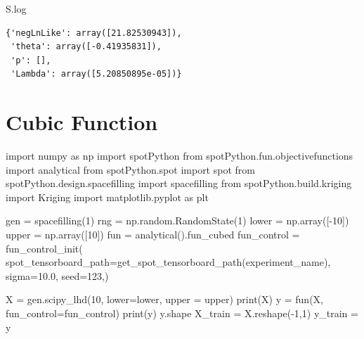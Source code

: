 \documentclass[
  letterpaper,
  DIV=11,
  numbers=noendperiod]{scrreprt}
\newenvironment{Shaded}{\begin{snugshade}}{\end{snugshade}}
\newcommand{\BuiltInTok}[1]{\textcolor[rgb]{0.00,0.23,0.31}{#1}}
\newcommand{\DecValTok}[1]{\textcolor[rgb]{0.68,0.00,0.00}{#1}}
\newcommand{\FloatTok}[1]{\textcolor[rgb]{0.68,0.00,0.00}{#1}}
\newcommand{\ImportTok}[1]{\textcolor[rgb]{0.00,0.46,0.62}{#1}}
\newcommand{\NormalTok}[1]{\textcolor[rgb]{0.00,0.23,0.31}{#1}}
\newcommand{\OperatorTok}[1]{\textcolor[rgb]{0.37,0.37,0.37}{#1}}
\begin{document}
\begin{Shaded}
\begin{Highlighting}[]
\NormalTok{S.log}
\end{Highlighting}
\end{Shaded}

\begin{verbatim}
{'negLnLike': array([21.82530943]),
 'theta': array([-0.41935831]),
 'p': [],
 'Lambda': array([5.20850895e-05])}
\end{verbatim}

\hypertarget{cubic-function}{%
\section{Cubic Function}\label{cubic-function}}

\begin{Shaded}
\begin{Highlighting}[]
\ImportTok{import}\NormalTok{ numpy }\ImportTok{as}\NormalTok{ np}
\ImportTok{import}\NormalTok{ spotPython}
\ImportTok{from}\NormalTok{ spotPython.fun.objectivefunctions }\ImportTok{import}\NormalTok{ analytical}
\ImportTok{from}\NormalTok{ spotPython.spot }\ImportTok{import}\NormalTok{ spot}
\ImportTok{from}\NormalTok{ spotPython.design.spacefilling }\ImportTok{import}\NormalTok{ spacefilling}
\ImportTok{from}\NormalTok{ spotPython.build.kriging }\ImportTok{import}\NormalTok{ Kriging}
\ImportTok{import}\NormalTok{ matplotlib.pyplot }\ImportTok{as}\NormalTok{ plt}

\NormalTok{gen }\OperatorTok{=}\NormalTok{ spacefilling(}\DecValTok{1}\NormalTok{)}
\NormalTok{rng }\OperatorTok{=}\NormalTok{ np.random.RandomState(}\DecValTok{1}\NormalTok{)}
\NormalTok{lower }\OperatorTok{=}\NormalTok{ np.array([}\OperatorTok{{-}}\DecValTok{10}\NormalTok{])}
\NormalTok{upper }\OperatorTok{=}\NormalTok{ np.array([}\DecValTok{10}\NormalTok{])}
\NormalTok{fun }\OperatorTok{=}\NormalTok{ analytical().fun\_cubed}
\NormalTok{fun\_control }\OperatorTok{=}\NormalTok{ fun\_control\_init(}
\NormalTok{    spot\_tensorboard\_path}\OperatorTok{=}\NormalTok{get\_spot\_tensorboard\_path(experiment\_name),}
\NormalTok{    sigma}\OperatorTok{=}\FloatTok{10.0}\NormalTok{,}
\NormalTok{    seed}\OperatorTok{=}\DecValTok{123}\NormalTok{,)}

\NormalTok{X }\OperatorTok{=}\NormalTok{ gen.scipy\_lhd(}\DecValTok{10}\NormalTok{, lower}\OperatorTok{=}\NormalTok{lower, upper }\OperatorTok{=}\NormalTok{ upper)}
\BuiltInTok{print}\NormalTok{(X)}
\NormalTok{y }\OperatorTok{=}\NormalTok{ fun(X, fun\_control}\OperatorTok{=}\NormalTok{fun\_control)}
\BuiltInTok{print}\NormalTok{(y)}
\NormalTok{y.shape}
\NormalTok{X\_train }\OperatorTok{=}\NormalTok{ X.reshape(}\OperatorTok{{-}}\DecValTok{1}\NormalTok{,}\DecValTok{1}\NormalTok{)}
\NormalTok{y\_train }\OperatorTok{=}\NormalTok{ y}


\end{Highlighting}
\end{Shaded}
\end{document}
